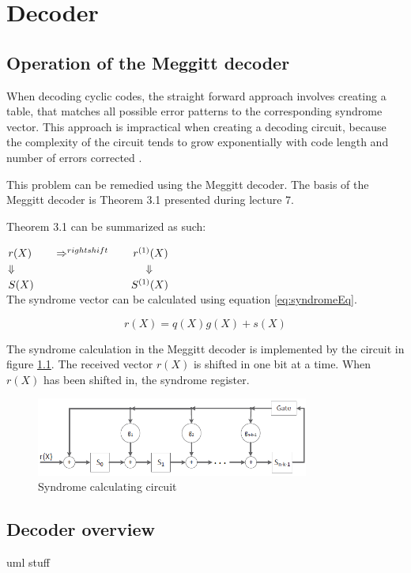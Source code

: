 \documentclass[Main]{subfiles}
\begin{document}
\chapter{Decoder}

\section{Operation of the Meggitt decoder}

When decoding cyclic codes, the straight forward approach involves creating a table, that matches all possible error patterns to the corresponding syndrome vector. This approach is impractical when creating a decoding circuit, because the complexity of the circuit tends to grow exponentially with code length and number of errors corrected \cite{lec7}.

This problem can be remedied using the Meggitt decoder. The basis of the Meggitt decoder is Theorem 3.1 presented during lecture 7\cite{lec7}.

\noindent
{}

Theorem 3.1 can be summarized as such:

$ r(X) \hspace*{2em}  \Rightarrow^{rightshift} \hspace*{2em} r^{(1)}(X)$ \\
$ \Downarrow \hspace*{12em} \Downarrow$ \\
$ S(X) \hspace*{9em} S^{(1)}(X)$ \\

The syndrome vector can be calculated using equation \ref{eq:syndromeEq}.

\begin{equation} \label{eq:syndromeEq}
r(X) = q(X)g(X)+s(X)
\end{equation}

The syndrome calculation in the Meggitt decoder is implemented by the circuit in figure \ref{fig:syndromeCirc}. The received vector $r(X)$ is shifted in one bit at a time. When $r(X)$ has been shifted in, the syndrome register.

\begin{figure}[h]
    \centering
    \includegraphics[width=0.8\textwidth]{figures/syndromeCircuit.png}
    \caption{Syndrome calculating circuit}
    \label{fig:syndromeCirc}
\end{figure}



\section{Decoder overview}

uml stuff



\end{document}
